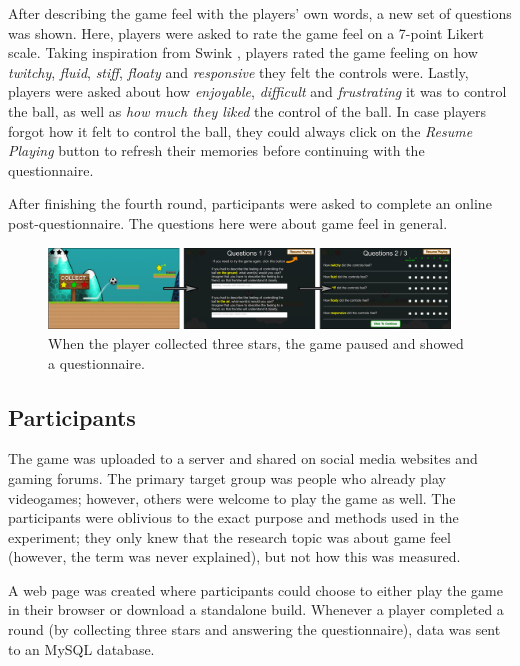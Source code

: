 After describing the game feel with the players' own words, a new set of questions was shown. Here, players were asked to rate the game feel on a 7-point Likert scale. Taking inspiration from Swink \cite{swink}, players rated the game feeling on how \textit{twitchy}, \textit{fluid}, \textit{stiff}, \textit{floaty} and \textit{responsive} they felt the controls were. Lastly, players were asked about how \textit{enjoyable}, \textit{difficult} and \textit{frustrating} it was to control the ball, as well as \textit{how much they liked} the control of the ball. In case players forgot how it felt to control the ball, they could always click on the \textit{Resume Playing} button to refresh their memories before continuing with the questionnaire.

After finishing the fourth round, participants were asked to complete an online post-questionnaire. The questions here were about game feel in general.

\begin{figure}[htbp]
\centering
\includegraphics[width=0.95\textwidth]{Pics/game_phases}
\caption{When the player collected three stars, the game paused and showed a questionnaire.}
\label{fig:questionnaire}
\end{figure}

\subsection{Participants}
The game was uploaded to a server and shared on social media websites and gaming forums. The primary target group was people who already play videogames; however, others were welcome to play the game as well. The participants were oblivious to the exact purpose and methods used in the experiment; they only knew that the research topic was about game feel (however, the term was never explained), but not how this was measured.

A web page was created where participants could choose to either play the game in their browser or download a standalone build. Whenever a player completed a round (by collecting three stars and answering the questionnaire), data was sent to an MySQL database.



